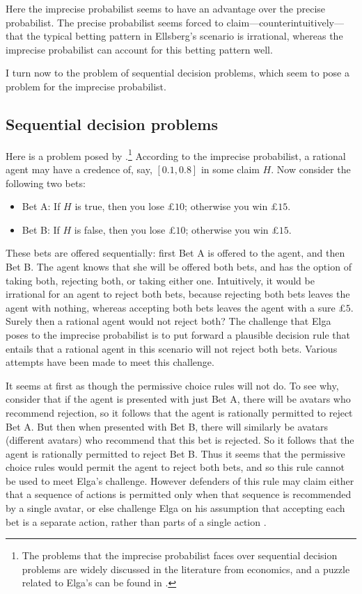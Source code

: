 Here the imprecise probabilist seems to have an advantage over the precise probabilist. The precise probabilist seems forced to claim---counterintuitively---that the typical betting pattern in Ellsberg's scenario is irrational, whereas the imprecise probabilist can account for this betting pattern well. 

I turn now to the problem of sequential decision problems, which seem to pose a problem for the imprecise probabilist. 


\subsection{Sequential decision problems}

Here is a problem posed by \citet{elga2010}.\footnote{The problems that the imprecise probabilist faces over sequential decision problems are widely discussed in the literature from economics, and a puzzle related to Elga's can be found in \citet{hammond1988}.} According to the imprecise probabilist, a rational agent may have a credence of, say, $[0.1,0.8]$ in some claim $H$. Now consider the following two bets:
\begin{itemize}
\item[] Bet A: If $H$ is true, then you lose £$10$; otherwise you win £$15$.
\item[] Bet B: If $H$ is false, then you lose £$10$; otherwise you win £$15$.
\end{itemize}
These bets are offered sequentially: first Bet A is offered to the agent, and then Bet B. The agent knows that she will be offered both bets, and has the option of taking both, rejecting both, or taking either one. Intuitively, it would be irrational for an agent to reject both bets, because rejecting both bets leaves the agent with nothing, whereas accepting both bets leaves the agent with a sure £$5$. Surely then a rational agent would not reject both? The challenge that Elga poses to the imprecise probabilist is to put forward a plausible decision rule that entails that a rational agent in this scenario will not reject both bets. Various attempts have been made to meet this challenge.  

It seems at first as though the permissive choice rules will not do. To see why, consider that if the agent is presented with just Bet A, there will be avatars who recommend rejection, so it follows that the agent is rationally permitted to reject Bet A. But then when presented with Bet B, there will similarly be avatars (different avatars) who recommend that this bet is rejected. So it follows that the agent is rationally permitted to reject Bet B. Thus it seems that the permissive choice rules would permit the agent to reject both bets, and so this rule cannot be used to meet Elga's challenge. However defenders of this rule may claim either that a sequence of actions is permitted only when that sequence is recommended by a single avatar, or else challenge Elga on his assumption that accepting each bet is a separate action, rather than parts of a single action \citep{weatherson2003,williams2014}. 

